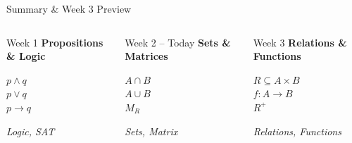 \documentclass{beamer}
\begin{document}
\begin{frame}[t,shrink=3]{Summary \& Week 3 Preview}
    \vspace{0.2cm}
    \begin{columns}[T]
        \begin{block}{\footnotesize Week 1}
            \footnotesize \textbf{Propositions \& Logic}
            \vspace{0.1cm}

            \centering
            \small $p \land q$\\$p \lor q$\\$p \rightarrow q$
            \vspace{0.1cm}

            \footnotesize\textit{Logic, SAT}
        \end{block}

        \begin{exampleblock}{\footnotesize Week 2 -- Today}
            \footnotesize \textbf{Sets \& Matrices}
            \vspace{0.1cm}

            \centering
            \small $A \cap B$\\$A \cup B$\\$M_R$
            \vspace{0.1cm}

            \footnotesize\textit{Sets, Matrix}
        \end{exampleblock}

        \begin{block}{\footnotesize Week 3}
            \footnotesize \textbf{Relations \& Functions}
            \vspace{0.1cm}

            \centering
            \small $R \subseteq A{\times}B$\\$f: A \to B$\\$R^+$
            \vspace{0.1cm}

            \footnotesize\textit{Relations, Functions}
        \end{block}
    \end{columns}


\end{frame}
\end{document}
